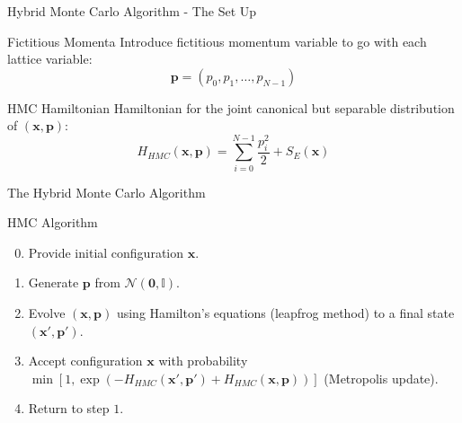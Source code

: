 \documentclass{beamer}
\begin{document}
    \begin{frame}{Hybrid Monte Carlo Algorithm - The Set Up}
        {
            \begin{block}{Fictitious Momenta}
            {   
                Introduce fictitious momentum variable to go with each lattice variable:
                \begin{equation*}
                    \label{eq:FictitiousMomenta}
                    \bm{p} = \left(p_0,p_1,\dots,p_{N-1}\right)
                \end{equation*}
            }
            \end{block}
        }
        {
            \begin{block}{HMC Hamiltonian}
                {
                Hamiltonian for the joint canonical but separable distribution of $\left(\bm{x},\bm{p}\right)$:
                \begin{equation*}
                    \label{eq:HMCHamiltonian}
                    H_{HMC}\left(\bm{x},\bm{p}\right) = \sum_{i=0}^{N-1} \frac{ p_{i}^{2} } {2} + S_{E}\left(\bm{x}\right)
                \end{equation*}
                }
            \end{block}
        }
    \end{frame}
    \begin{frame}{The Hybrid Monte Carlo Algorithm}
        {
            \begin{block}{HMC Algorithm}
                \begin{enumerate} 
                    \setcounter{enumi}{-1}

                    \item<1-> Provide initial configuration $\bm{x}$.

                    \item<2-> Generate $\bm{p}$ from $\mathcal{N}\left(\bm{0},\mathbb{I}\right)$.

                    \item<3-> Evolve $\left(\bm{x}, \bm{p}\right)$ using Hamilton's equations (leapfrog method) to a final state $\left(\bm{x}', \bm{p}'\right)$.

                    \item<4-> Accept configuration $\bm{x}$ with probability $ \min{\left[1,\exp{\left(-H_{HMC}\left(\bm{x}',\bm{p}'\right)+H_{HMC}\left(\bm{x},\bm{p}\right)\right)}\right]}$ (Metropolis update).

                    \item<5-> Return to step $1$.
                \end{enumerate}
            \end{block}
        } 
    \end{frame}
\end{document}
